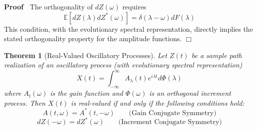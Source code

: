 \documentclass{article}
\newenvironment{proof}{\noindent\textbf{Proof\ }}{\hspace*{\fill}$\Box$\medskip}
\newtheorem{theorem}{Theorem}
\begin{document}
\begin{proof}
  The orthogonality of $dZ (\omega)$ requires
  \[ \mathbb{E} [dZ (\lambda) dZ^{\ast} (\omega)] = \delta (\lambda - \omega)
     dF (\lambda) \]
  This condition, with the evolutionary spectral representation, directly
  implies the stated orthogonality property for the amplitude functions.
\end{proof}

\begin{theorem}[Real-Valued Oscillatory Processes]
  Let $Z (t)$ be a sample path realization of an oscillatory process (with
  evolutionary spectral representation)
  \begin{equation}
    X (t) = \int_{- \infty}^{\infty} A_{\lambda} (t) e^{i \lambda t} d \Phi
    (\lambda)
  \end{equation}
  where $A_t (\omega)$ is the gain function and $\Phi (\omega)$ is an
  orthogonal increment process. Then $X (t)$ is real-valued if and only if the
  following conditions hold:
  \begin{equation}
    A (t, \omega) = A^{\ast} (t, - \omega) \qquad \text{(Gain Conjugate
    Symmetry)}
  \end{equation}
  \begin{equation}
    dZ (- \omega) = dZ^{\ast} (\omega) \qquad \text{(Increment Conjugate
    Symmetry)}
  \end{equation}
\end{theorem}
\end{document}
